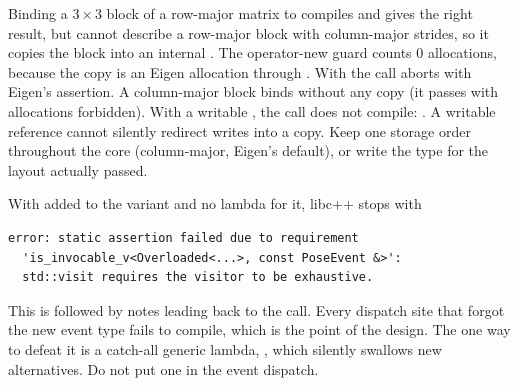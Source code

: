 \begin{solutions}
  \item Binding a $3\times3$ block of a row-major matrix to  compiles and gives the right result, but  cannot describe a row-major block
        with column-major strides, so it copies the block into an internal . The operator-new guard counts 0 allocations, because the copy is an Eigen
        allocation through . With  the call aborts with Eigen's assertion. A column-major block binds without any copy (it passes with
        allocations forbidden). With a writable , the call does not compile: . A writable reference cannot
        silently redirect writes into a copy. Keep one storage order throughout the core (column-major, Eigen's default), or write the  type for the layout
        actually passed.

  \item With  added to the variant and no lambda for it, libc++ stops with
\begin{lstlisting}[language={}, basicstyle=\ttfamily\footnotesize]
error: static assertion failed due to requirement
  'is_invocable_v<Overloaded<...>, const PoseEvent &>':
  std::visit requires the visitor to be exhaustive.
\end{lstlisting}
        This is followed by notes leading back to the  call. Every dispatch site that forgot the new event type fails to compile, which is the point of the
        design. The one way to defeat it is a catch-all generic lambda, , which silently swallows new alternatives. Do not put one in the
        event dispatch.
\end{solutions}
